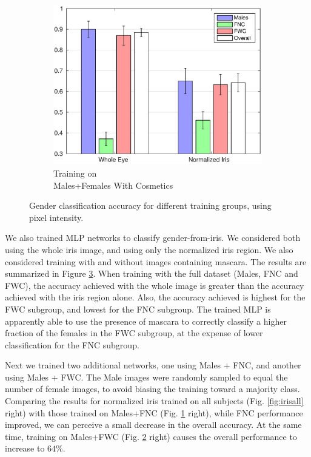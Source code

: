 \documentclass[10pt,twocolumn,letterpaper]{article}
\begin{document}
\begin{figure}[!htbp]
\begin{subfigure}[b]{0.3\textwidth}
        \label{fig:irisfnc}
    \end{subfigure}
    \hfill
    \begin{subfigure}[b]{0.3\textwidth}
        \centering
        \includegraphics[width=\textwidth]{img/acc_fwc.eps}
        \caption{Training on \\Males+Females With Cosmetics}
        \label{fig:irisfwc}
    \end{subfigure}
    \caption{Gender classification accuracy for different training groups, using pixel intensity.}
    \label{fig:irisdist}
\end{figure}

We also trained MLP networks to classify gender-from-iris. 
We considered both using the whole iris image, and using only the normalized iris region.
We also considered training with and without images containing mascara. 
The results are summarized in Figure \ref{fig:irisdist}.
When training with the full dataset (Males, FNC and FWC), the accuracy achieved with the whole image is greater than the accuracy achieved with the iris region alone.
Also, the accuracy achieved is highest for the FWC subgroup, and lowest for the FNC subgroup.
The trained MLP is apparently able to use the presence of mascara to correctly classify a higher fraction of the females in the FWC subgroup, at the expense of lower classification for the FNC subgroup.

Next we trained two additional networks, one using Males + FNC, and another using Males + FWC.
The Male images were randomly sampled to equal the number of female images, to avoid biasing the training toward a majority class.
Comparing the results for normalized iris trained on all subjects (Fig. \ref{fig:irisall} right) with those trained on Males+FNC (Fig. \ref{fig:irisfnc} right), while FNC performance improved, we can perceive a small decrease in the overall accuracy.
At the same time, training on Males+FWC (Fig. \ref{fig:irisfwc} right) causes the overall performance to increase to $64\%$. 
\end{document}
